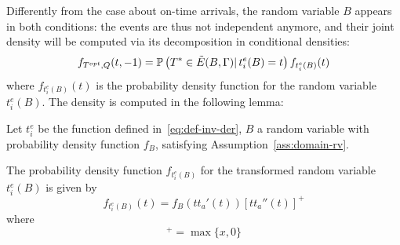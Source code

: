 Differently from the case about on-time arrivals,
the random variable \(B\) appears in both conditions:
the events are thus not independent anymore,
and their joint density will be computed via its decomposition in conditional densities:
\begin{equation}
  \label{eq:late-joint-decomp}
  f_{T^{opt}, Q}(t, -1) = \mathbb{P}\left(T^* \in \tilde{E}(B, \Gamma)|\, t_i^e(B) = t\right) f_{t_i^e(B)}(t)
\end{equation}
where \(f_{t_i^e(B)}(t)\) is the probability density function for the random variable \(t_i^e(B)\).
The density is computed in the following lemma:
\begin{lemma}
  \label{lemma:transformed-B}
  Let \(t_i^e\) be the function defined in~\eqref{eq:def-inv-der}, \(B\) a random variable with probability density function \(f_B\),
  satisfying Assumption~\ref{ass:domain-rv}.
  
  The probability density function \(f_{t_i^e(B)}\) for the transformed random variable \(t_i^e(B)\) is given by
  \begin{equation*}
    f_{t_i^e(B)}(t) = f_B(tt_a'(t)) [tt_a''(t)]^+
  \end{equation*}
  where
  \begin{equation*}
    [x]^+ = \max\{x, 0\}
  \end{equation*}
\end{lemma}

